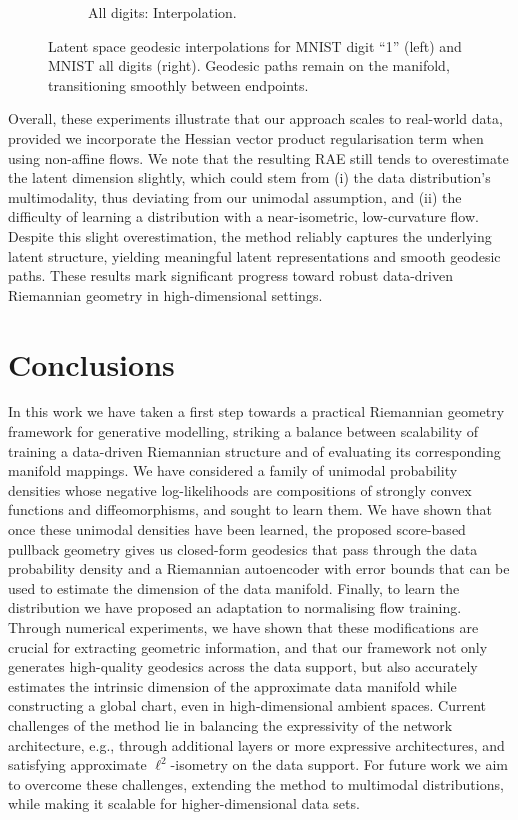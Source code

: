 \begin{figure}[htbp]
\begin{subfigure}[b]{0.45\textwidth}
            \caption{\scriptsize All digits: Interpolation.}
        \end{subfigure}
        \caption{Latent space geodesic interpolations for MNIST digit ``1'' (left) and MNIST all digits (right). Geodesic paths remain on the manifold, transitioning smoothly between endpoints.}
        \label{fig:mnist_interpolations}
    \end{figure}
    
    Overall, these experiments illustrate that our approach scales to real-world data, provided we incorporate the Hessian vector product regularisation term when using non-affine flows. We note that the resulting RAE still tends to overestimate the latent dimension slightly, which could stem from (i) the data distribution’s multimodality, thus deviating from our unimodal assumption, and (ii) the difficulty of learning a distribution with a near-isometric, low-curvature flow. Despite this slight overestimation, the method reliably captures the underlying latent structure, yielding meaningful latent representations and smooth geodesic paths. These results mark significant progress toward robust data-driven Riemannian geometry in high-dimensional settings.

    
\section{Conclusions}
\label{sec:conclusions}

In this work we have taken a first step towards a practical Riemannian geometry framework for generative modelling, striking a balance between scalability of training a data-driven Riemannian structure and of evaluating its corresponding manifold mappings. We have considered a family of unimodal probability densities whose negative log-likelihoods are compositions of strongly convex functions and diffeomorphisms, and sought to learn them. We have shown that once these unimodal densities have been learned, the proposed score-based pullback geometry gives us closed-form geodesics that pass through the data probability density and a Riemannian autoencoder with error bounds that can be used to estimate the dimension of the %
data manifold. Finally, to learn the distribution we have proposed an adaptation to normalising flow training. Through numerical experiments, we have shown that these modifications are crucial for extracting geometric information, and that our framework not only generates high-quality geodesics across the data support, but also accurately estimates the intrinsic dimension of the approximate data manifold while constructing a global chart, even in high-dimensional ambient spaces. Current challenges of the method lie in balancing the expressivity of the network architecture, e.g., through additional layers or more expressive architectures, and satisfying approximate $\ell^2$-isometry on the data support. For future work we aim to overcome these challenges, extending the method to multimodal distributions, while making it scalable for higher-dimensional data sets.
